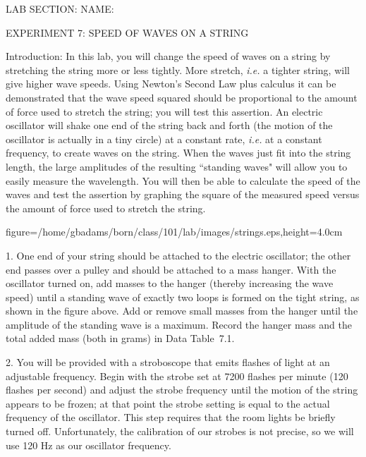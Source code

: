 
\baselineskip=15pt
\vglue-0.7in
\hglue-2.0cm LAB SECTION:
\underbar{~~~~~~~~~~~~~~~~~~~~~~~~~~~~~~~~~~~~~~~~~~~~~~}
 NAME:
\rlap{
\underbar{~~~~~~~~~~~~~~~~~~~~~~~~~~~~~~~~~~~~~~~~~~~~~~}
}
\bigskip
\bigskip
\bigskip
\centerline{EXPERIMENT 7: SPEED OF WAVES ON A STRING}
\bigskip
Introduction:  In this lab, you will change the speed of
waves on a string by stretching the string more or less
tightly.  More stretch, {\it i.e.} a tighter string, will
give higher wave speeds.  Using Newton's Second Law plus 
calculus it can be demonstrated that the wave speed squared 
should be proportional to the amount of force used to 
stretch the string; you will test this assertion.  An 
electric oscillator will shake one end of the string back 
and forth (the motion of the oscillator is actually in a 
tiny circle) at a constant rate, {\it i.e.} at a constant 
frequency, to create waves on the string.  When the waves 
just fit into the string length, the large amplitudes of 
the resulting ``standing waves" will allow you to easily 
measure the wavelength.  You will then be able to calculate 
the speed of the waves and test the assertion by graphing 
the square of the measured speed versus the amount of force 
used to stretch the string.
\smallskip
\smallskip
\centerline{\psfig
{figure=/home/gbadams/born/class/101/lab/images/strings.eps,height=4.0cm}}
\smallskip
{}   

\item{1.} One end of your string should be attached to
the electric oscillator; the other end passes over a
pulley and should be attached to a mass hanger.  With
the oscillator turned on, add masses to the hanger (thereby
increasing the wave speed) until a standing wave of
exactly two loops is formed on the tight string, as
shown in the figure above.  Add or remove small masses 
from the hanger until the amplitude of the standing 
wave is a maximum.  Record the hanger mass and the total
added mass (both in grams) in Data Table~7.1.

\item{2.} You will be provided with a stroboscope that 
emits flashes of light at an adjustable frequency.  
Begin with the strobe set at 7200 flashes per minute
(120 flashes per second) and adjust the strobe frequency 
until the motion of the string appears to be frozen; at 
that point the strobe setting is equal to the actual 
frequency of the oscillator.  This step requires that 
the room lights be briefly turned off.  Unfortunately,
the calibration of our strobes is not precise, so we 
will use 120 Hz as our oscillator frequency.

